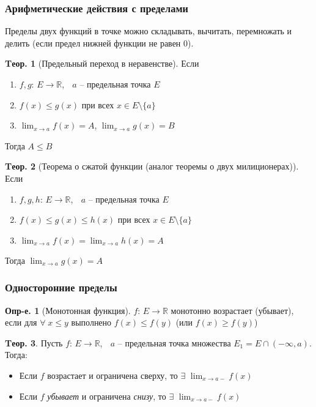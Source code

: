 \documentclass[a4paper,12pt]{article}
\numberwithin{figure}{section}
\theoremstyle{definition}
\newtheorem{definition}{Опр-е.}[section]
\theoremstyle{definition}
\newtheorem{theorem}{Tеор.}[section]
\def\DS{\displaystyle}
\def\mathR{\mathbb{R}}
\def\leqs{\leqslant}
\def\geqs{\geqslant}
\def\any {$\forall\;$}
\begin{document}
\subsubsection{Арифметические действия с пределами}

Пределы двух функций в точке можно складывать, вычитать, перемножать и делить (если предел нижней функции не равен 0).


\begin{theorem}[Предельный переход в неравенстве]
  Если \begin{enumerate}
	\item $f,g :\, E\to\mathR$, $\;$ $a$ -- предельная точка $E$
	\item $f(x) \leqs g(x)$ при всех $x \in E \setminus \{a\}$
	\item $\DS\lim_{x\to a}f(x)=A$, $\DS\lim_{x\to a}g(x)=B$
  \end{enumerate}
  Тогда $A \leqs B$
\end{theorem}

\begin{theorem}[Теорема о сжатой функции (аналог теоремы о двух милиционерах)]
  Если \begin{enumerate}
	\item $f,g,h :\, E\to\mathR$, $\;$ $a$ -- предельная точка $E$
	\item $f(x) \leqs g(x) \leqs h(x)$ при всех $x \in E \setminus \{a\}$
	\item $\DS \lim_{x\to a}f(x)=\lim_{x\to a}h(x)=A$
  \end{enumerate}
  Тогда $\DS \lim_{x\to a}g(x)=A$
\end{theorem}

\subsubsection{Односторонние пределы}

\begin{definition}[Монотонная функция]
	$f :\, E\to\mathR$ монотонно возрастает (убывает), если для \any $x \leqs y$
	выполнено $f(x) \leqs f(y)$ (или $f(x) \geqs f(y)$)
\end{definition}


\begin{theorem}
	Пусть $f:\, E\to\mathR$, $\;$ $a$ -- предельная точка множества $E_1=E \cap (-\infty,a)$.
	Тогда: \begin{itemize}
		\item Если $f$ возрастает и ограничена сверху, то
			  $\exists$ $\DS \lim_{x\to a-}f(x)$
		\item Если $f$ \textit{убывает} и ограничена \textit{снизу}, то
			  $\exists$ $\DS \lim_{x\to a-}f(x)$
	\end{itemize}
\end{theorem}
\end{document}
